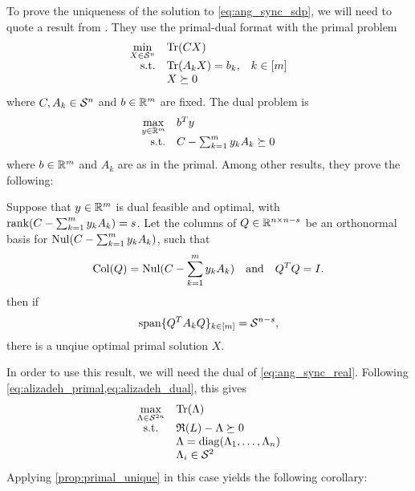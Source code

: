 To prove the uniqueness of the solution to \eqref{eq:ang_sync_sdp}, we will need to quote a result from \cite{alizadeh1997nondegeneracy}.  They use the primal-dual format with the primal problem
\begin{equation}
  \begin{array}{rlc}
    \displaystyle \min_{X \in \mathcal{S}^n} & \operatorname{Tr}(C X) \\
    \text{s.t.} & \operatorname{Tr}(A_k X) = b_k, & k \in [m] \\
    & X \succeq 0
  \end{array} \label{eq:alizadeh_primal}
\end{equation}
where $C, A_k \in \mathcal{S}^n$ and $b \in \mathbb{R}^m$ are fixed.  The dual problem is
\begin{equation}
  \begin{array}{rl}
    \displaystyle\max_{y \in \mathbb{R}^m} & b^T y \\
    \text{s.t.} & C - \sum_{k = 1}^m y_k A_k \succeq 0
  \end{array} \label{eq:alizadeh_dual}
\end{equation}
where $b \in \mathbb{R}^m$ and $A_k$ are as in the primal.  Among other results, they prove the following:

\begin{proposition}
  Suppose that $y \in \mathbb{R}^m$ is dual feasible and optimal, with $\operatorname{rank}(C - \sum_{k = 1}^m y_k A_k) = s$.  Let the columns of $Q \in \mathbb{R}^{n \times n - s}$ be an orthonormal basis for $\operatorname{Nul}(C - \sum_{k = 1}^m y_k A_k)$, such that  \[\operatorname{Col}(Q) = \operatorname{Nul}(C - \sum_{k = 1}^m y_k A_k) \quad \text{and} \quad Q^T Q = I.\] then if \[\operatorname{span} \{Q^T A_k Q\}_{k \in [m]} = \mathcal{S}^{n - s},\] there is a unqiue optimal primal solution $X$. \label{prop:primal_unique}
\end{proposition}

In order to use this result, we will need the dual of \eqref{eq:ang_sync_real}.  Following \cref{eq:alizadeh_primal,eq:alizadeh_dual}, this gives
\begin{equation}
  \begin{array}{cl}
    \max\limits_{\Lambda \in \mathcal{S}^{2n}} & \operatorname{Tr}(\Lambda) \\
    \text{s.t.} & \mathfrak{R}(L) - \Lambda \succeq 0 \\
    & \Lambda = \operatorname{diag}(\Lambda_1, \ldots, \Lambda_n) \\
    & \Lambda_i \in \mathcal{S}^2
  \end{array} \label{eq:ang_sync_real_dual}
\end{equation}
Applying \cref{prop:primal_unique} in this case yields the following corollary:


